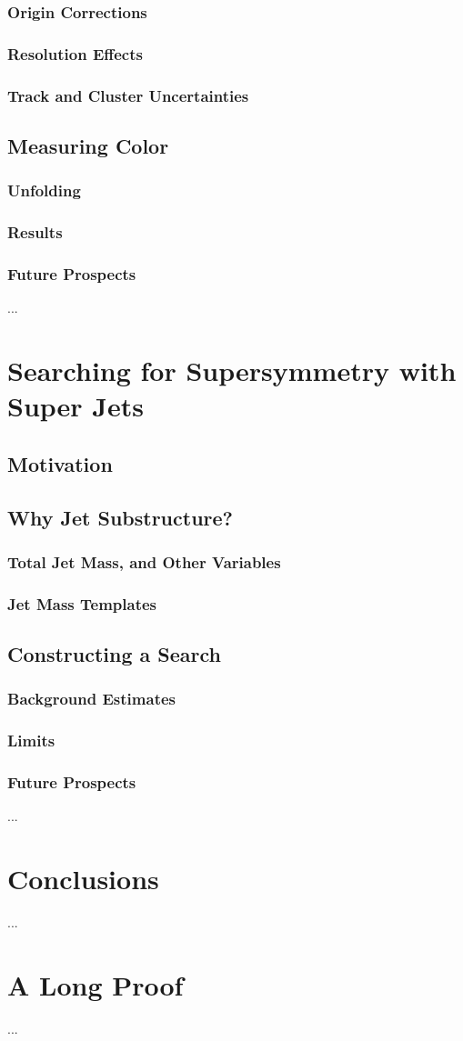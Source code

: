 \documentclass{report}
\begin{document}
	\subsection{Origin Corrections}
	\subsection{Resolution Effects}
	\subsection{Track and Cluster Uncertainties}
\section{Measuring Color}
	\subsection{Unfolding}
	\subsection{Results}
	\subsection{Future Prospects}
		...

\chapter{Searching for Supersymmetry with Super Jets}
\section{Motivation}
\section{Why Jet Substructure?}
	\subsection{Total Jet Mass, and Other Variables}
	\subsection{Jet Mass Templates}
\section{Constructing a Search}
	\subsection{Background Estimates}
	\subsection{Limits}
	\subsection{Future Prospects}
		...


\chapter{Conclusions}
         ...
\appendix
\chapter{A Long Proof}
         ...


\end{document}
